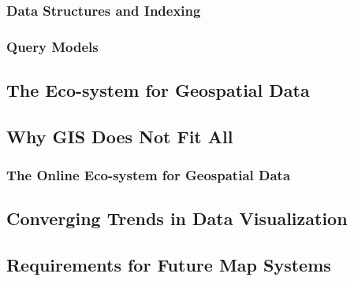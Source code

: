 \documentclass[11pt, oneside]{report}   	%
\begin{document}
\subsubsection{Data Structures and Indexing}

\subsubsection{Query Models}

\subsection{The Eco-system for Geospatial Data}

\subsection{Why GIS Does Not Fit All}
\subsubsection{The Online Eco-system for Geospatial Data}



\subsection{Converging Trends in Data Visualization}

\subsection{Requirements for Future Map Systems}
\end{document}
